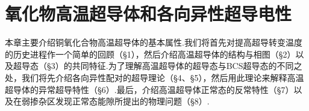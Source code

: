 \chapter{氧化物高温超导体和各向异性超导电性}

本章主要介绍铜氧化合物高温超导体的基本属性.我们将首先对提高超导转变温度的历史进程作一个简单的回顾（§1），然后介绍高温超导体的结构与相图（§2）以及超导态（§3）的共同特征.为了理解高温超导体的超导态与BCS超导态的不同之处，我们将先介绍各向异性配对的超导理论（§4、§5），然后用此理论来解释高温超导体的异常超导特性（§6）.最后，介绍高温超导体正常态的反常特性（§7）以及在弱掺杂区发现正常态能隙所提出的物理问题（§8）.

